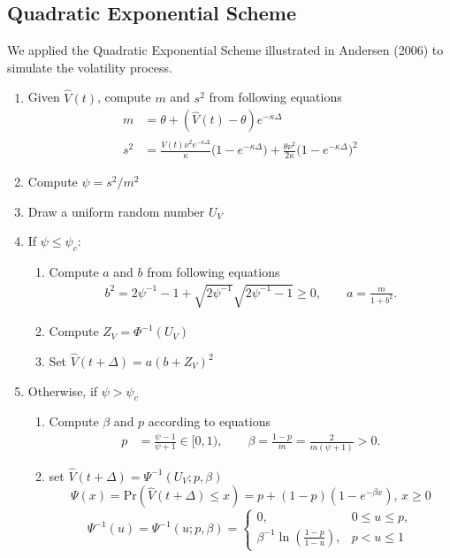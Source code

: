 \documentclass{ws-ijfe}
\begin{document}
\subsection{Quadratic Exponential Scheme}
We applied the Quadratic Exponential Scheme illustrated in Andersen (2006) \cite{Andersen} to simulate the volatility process.
\begin{enumerate}
\item Given $\hat{V}(t)$, compute $m$ and $s^2$ from following equations
\begin{align*}
  m &=\theta + (\hat{V}(t)-\theta)e^{-\kappa\Delta} \\
  s^2 &=\frac{\hat{V}(t)\nu^2 e^{-\kappa\Delta}}{\kappa}\bigg(1-e^{-\kappa\Delta}\bigg)+\frac{\theta\nu^2}{2\kappa}\bigg(1-e^{-\kappa\Delta}\bigg)^2
\end{align*}
\item Compute $\psi=s^2/m^2$\\
\item Draw a uniform random number $U_V$
\item If $\psi\leq\psi_c$:
\begin{enumerate}
\item Compute $a$ and $b$ from following equations
\begin{align*}
b^2=2\psi^{-1}-1+\sqrt{2\psi^{-1}}\sqrt{2\psi^{-1}-1}\geq 0, \qquad a =\frac{m}{1+b^2}.
\end{align*}
\item Compute $Z_V=\Phi^{-1}(U_V)$
\item Set $\hat{V}(t+\Delta)=a(b+Z_V)^2$
\end{enumerate}
\item Otherwise, if $\psi>\psi_c$
\begin{enumerate}
  \item Compute $\beta$ and $p$ according to equations
  \begin{align*}
    p & =\frac{\psi-1}{\psi+1}\in[0,1), \qquad%
    \beta =\frac{1-p}{m}=\frac{2}{m(\psi+1)}>0.
  \end{align*}
  \item set $\hat{V}(t+\Delta)=\Psi^{-1}(U_V;p,\beta)$
  \begin{equation*}
    \Psi(x) = \text{Pr}(\hat{V}(t+\Delta)\leq x) = p+(1-p)(1-e^{-\beta x}),\, x\geq 0
  \end{equation*}
  \[
  \Psi^{-1}(u)=\Psi^{-1}(u;p,\beta)=
  \begin{cases}
    0,\,&0\leq u \leq p,\\
    \beta^{-1}\ln(\frac{1-p}{1-u}),&p<u\leq1
  \end{cases}
  \]
\end{enumerate}
\end{enumerate}
\end{document}
